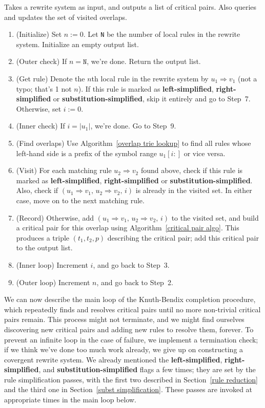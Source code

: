 \documentclass[../generics]{subfiles}
\begin{document}
\begin{algorithm}\label{find overlapping rule algo}
Takes a rewrite system as input, and outputs a list of critical pairs. Also queries and updates the set of visited overlaps.
\begin{enumerate}
\item (Initialize) Set $n:=0$. Let \texttt{N} be the number of local rules in the rewrite system. Initialize an empty output list.
\item (Outer check) If $n=\texttt{N}$, we're done. Return the output list.
\item (Get rule) Denote the $n$th local rule in the rewrite system by $u_1\Rightarrow v_1$ (not a typo; that's 1 not $n$). If this rule is marked as \textbf{left-simplified}, \textbf{right-simplified} or \textbf{substitution-simplified}, skip it entirely and go to Step~7. Otherwise, set $i:=0$.
\item (Inner check) If $i=|u_1|$, we're done. Go to Step~9.
\item (Find overlaps) Use Algorithm~\ref{overlap trie lookup} to find all rules whose left-hand side is a prefix of the symbol range $u_1[i:]$ or vice versa.
\item (Visit) For each matching rule $u_2\Rightarrow v_2$ found above, check if this rule is marked as \textbf{left-simplified}, \textbf{right-simplified} or \textbf{substitution-simplified}. Also, check if $(u_1\Rightarrow v_1,\,u_2\Rightarrow v_2,\,i)$ is already in the visited set. In either case, move on to the next matching rule.
\item (Record) Otherwise, add $(u_1\Rightarrow v_1,\,u_2\Rightarrow v_2,\,i)$ to the visited set, and build a critical pair for this overlap using Algorithm~\ref{critical pair algo}. This produces a triple $(t_1, t_2, p)$ describing the critical pair; add this critical pair to the output list.
\item (Inner loop) Increment $i$, and go back to Step~3.
\item (Outer loop) Increment $n$, and go back to Step~2.
\end{enumerate}
\end{algorithm}

We can now describe the main loop of the Knuth-Bendix completion procedure, which repeatedly finds and resolves critical pairs until no more non-trivial critical pairs remain. This process might not terminate, and we might find ourselves discovering new critical pairs and adding new rules to resolve them, forever. To prevent an infinite loop in the case of failure, we implement a termination check; if we think we've done too much work already, we give up on constructing a covergent rewrite system. We already mentioned the \textbf{left-simplified}, \textbf{right-simplified}, and \textbf{substitution-simplified} flags a few times; they are set by the rule simplification passes, with the first two described in Section~\ref{rule reduction} and the third one in Section~\ref{subst simplification}. These passes are invoked at appropriate times in the main loop below.
\end{document}
